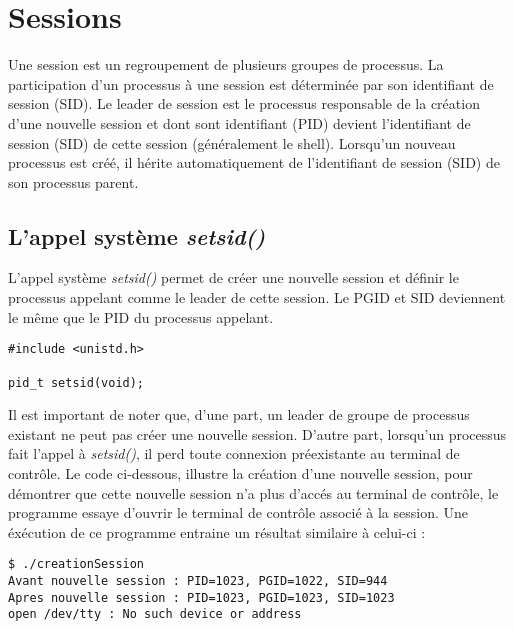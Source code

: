 \section{Sessions}
Une session est un regroupement de plusieurs groupes de processus. La participation d'un processus à une session est déterminée par son identifiant de session (SID). Le leader de session est le processus responsable de la création d'une nouvelle session et dont sont identifiant (PID) devient l'identifiant de session (SID) de cette session (généralement le shell). Lorsqu'un nouveau processus est créé, il hérite automatiquement de l'identifiant de session (SID) de son processus parent.

\subsection{L’appel système \textit{setsid()} }
L’appel système \textit{setsid()} permet de créer une nouvelle session et définir le processus appelant comme le leader de cette session. Le PGID et SID deviennent le même que le PID du processus appelant.
\newline
\begin{lstlisting}
#include <unistd.h>

pid_t setsid(void);
\end{lstlisting}
Il est important de noter que, d'une part, un leader de groupe de processus existant ne peut pas créer une nouvelle session. D'autre part, lorsqu'un processus fait l'appel à \textit{setsid()}, il perd toute connexion préexistante au terminal de contrôle. 
\newline
Le code ci-dessous, illustre la création d'une nouvelle session, pour démontrer que cette nouvelle session n'a plus d'accés au terminal de contrôle, le programme essaye d'ouvrir
le terminal de contrôle associé à la session. Une éxécution de ce programme entraine un résultat similaire à celui-ci  :

\begin{lstlisting}[style=blackstyle]
$ ./creationSession
Avant nouvelle session : PID=1023, PGID=1022, SID=944
Apres nouvelle session : PID=1023, PGID=1023, SID=1023
open /dev/tty : No such device or address
\end{lstlisting}

